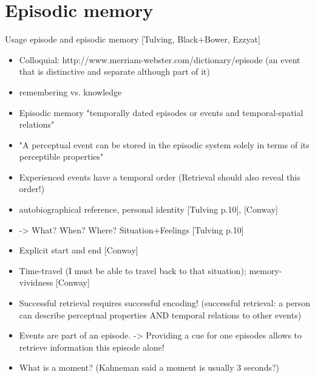 %

\section{Episodic memory}
Usage episode and episodic memory [Tulving, Black+Bower, Ezzyat]
\begin{itemize}
\item Colloquial:  http://www.merriam-webster.com/dictionary/episode (an event that is distinctive and separate although part of it)
\item remembering vs. knowledge \cite{tulving_concepts_2000}

\item Episodic memory "temporally dated episodes or events and temporal-spatial relations" \cite[385]{tulving_concepts_2000}
\item "A perceptual event can be stored in the episodic system solely in terms of its perceptible properties"\cite[385]{tulving_concepts_2000}
\item Experienced events have a temporal order (Retrieval should also reveal this order!)\cite{tulving_concepts_2000}

\item autobiographical reference, personal identity [Tulving p.10], [Conway]
\item -> What? When? Where? Situation+Feelings [Tulving p.10]
\item Explicit start and end [Conway]
\item Time-travel (I must be able to travel back to that situation); memory-vividness [Conway]
      
\item Successful retrieval requires successful encoding! (successful retrieval: a person can describe perceptual properties AND temporal relations to other events)

\item Events are part of an episode. -> Providing a cue for one episodes allows to retrieve information this episode alone!
\item What is a moment? (Kahneman said a moment is usually 3 seconds?)
\end{itemize}

